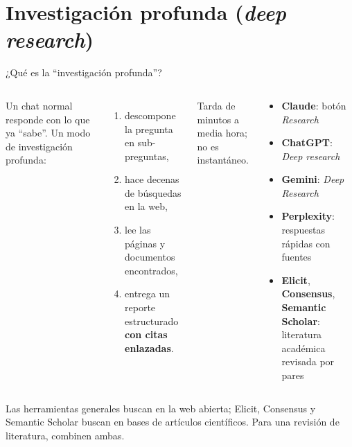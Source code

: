 \documentclass[aspectratio=169,10pt]{beamer}
\begin{document}
\section{Investigación profunda (\emph{deep research})}

\begin{frame}{¿Qué es la ``investigación profunda''?}
\begin{columns}[T]
Un chat normal responde con lo que ya ``sabe''. Un modo de investigación profunda:
\begin{enumerate}\small
  \item descompone la pregunta en sub-preguntas,
  \item hace decenas de búsquedas en la web,
  \item lee las páginas y documentos encontrados,
  \item entrega un reporte estructurado \textbf{con citas enlazadas}.
\end{enumerate}
Tarda de minutos a media hora; no es instantáneo.
\begin{tcolorbox}[enhanced,colback=white,colframe=Md,arc=2mm,
  title={\faSearchPlus\ Dónde encontrarla},fonttitle=\bfseries\color{white},colbacktitle=Md]
\footnotesize
\begin{itemize}
  \item \textbf{Claude}: botón \emph{Research}
  \item \textbf{ChatGPT}: \emph{Deep research}
  \item \textbf{Gemini}: \emph{Deep Research}
  \item \textbf{Perplexity}: respuestas rápidas con fuentes
  \item \textbf{Elicit}, \textbf{Consensus}, \textbf{Semantic Scholar}: literatura académica revisada por pares
\end{itemize}
\end{tcolorbox}
\end{columns}
\vspace{6pt}
\begin{tipbox}
Las herramientas generales buscan en la web abierta; Elicit, Consensus y Semantic Scholar buscan en bases de artículos científicos. Para una revisión de literatura, combinen ambas.
\end{tipbox}
\end{frame}
\end{document}
